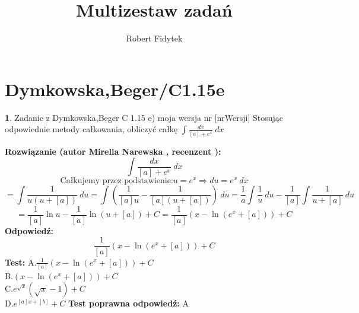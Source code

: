 \documentclass[12pt, a4paper]{article}
\title{Multizestaw zadań}
\author{Robert Fidytek}
\date{}
\theoremstyle{definition} %
\newtheorem{zad}{}
\newcommand{\kategoria}[1]{\section{#1}} %
\newcommand{\zadStart}[1]{\begin{zad}#1\newline} %
\newcommand{\zadStop}{\end{zad}}   %
\newcommand{\rozwStart}[2]{\noindent \textbf{Rozwiązanie (autor #1 , recenzent #2): }\newline} %
\newcommand{\odpStart}{\noindent \textbf{Odpowiedź:}\newline}    %
\newcommand{\odpStop}{\newline}                                             %
\newcommand{\testStart}{\noindent \textbf{Test:}\newline} %
\newcommand{\testStop}{\newline} %
\newcommand{\kluczStart}{\noindent \textbf{Test poprawna odpowiedź:}\newline} %
\newcommand{\kluczStop}{\newline} %
\begin{document}
\maketitle



\kategoria{Dymkowska,Beger/C1.15e}
\zadStart{Zadanie z Dymkowska,Beger C 1.15 e) moja wersja nr [nrWersji]}
Stosując odpowiednie metody całkowania, obliczyć całkę $\displaystyle \int \frac{dx}{[a]+e^x} \ dx$
\zadStop
\rozwStart{Mirella Narewska}{}
$$\int \frac{dx}{[a]+e^x} \ dx$$
$$\text{Całkujemy przez podstawienie:} u=e^x\Rightarrow du=e^x \ dx$$
$$=\int \frac{1}{u(u+[a])} \ du= \int \left( \frac{1}{[a]u} -\frac{1}{[a](u+[a])} \right) \ du=\frac{1}{a}\int \frac{1}{u} \ du-\frac{1}{[a]}\int \frac{1}{u+[a]} \ du$$
$$=\frac{1}{[a]}\ln u -\frac{1}{[a]}\ln (u+[a]) +C=\frac{1}{[a]}\left(x-\ln (e^x+[a])\right)+C$$
\odpStart
$$\frac{1}{[a]}\left(x-\ln (e^x+[a])\right)+C$$
\odpStop
\testStart
A.$\frac{1}{[a]}\left(x-\ln (e^x+[a])\right)+C$
\\
B.$(x-\ln (e^x+[a]))+C$
\\
C.$e^{\sqrt{x}}(\sqrt{x}-1)+C$
\\
D.$e^{[a]x+[b]}+C$
\testStop
\kluczStart
A
\kluczStop
\end{document}
